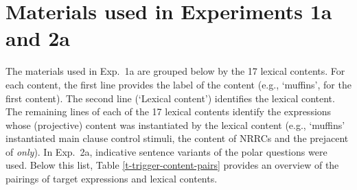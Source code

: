 \documentclass[11pt,fleqn]{article}
\newcommand{\6}{\mbox{$[\hspace*{-.6mm}[$}}
\newcommand{\9}{\mbox{$]\hspace*{-.6mm}]$}}
\begin{document}
%
%
%
%
%
%
%
%
%
%
%
%
%
%
%
%
%
%
%

\section{Materials used in Experiments 1a and 2a}\label{a-exp1a-2a-stimuli}

The materials used in Exp.~1a are grouped below by the 17 lexical contents. For each content, the first line provides the label of the content (e.g., `muffins', for the first content). The second line (`Lexical content') identifies the lexical content. The remaining lines of each of the 17 lexical contents identify the expressions whose (projective) content was instantiated by the lexical content (e.g., `muffins' instantiated main clause control stimuli, the content of NRRCs and the prejacent of {\em only}). In Exp.~2a, indicative sentence variants of the polar questions were used. Below this list, Table \ref{t-trigger-content-pairs} provides an overview of the pairings of target expressions and lexical contents.
\end{document}
